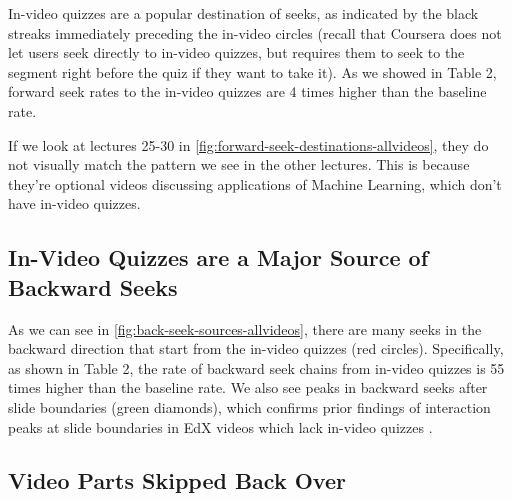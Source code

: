 \documentclass{sigchi}
\begin{document}
In-video quizzes are a popular destination of seeks, as indicated by the black streaks immediately preceding the in-video circles (recall that Coursera does not let users seek directly to in-video quizzes, but requires them to seek to the segment right before the quiz if they want to take it). As we showed in Table 2, forward seek rates to the in-video quizzes are 4 times higher than the baseline rate.


If we look at lectures 25-30 in \autoref{fig:forward-seek-destinations-allvideos}, they do not visually match the pattern we see in the other lectures. This is because they're optional videos discussing applications of Machine Learning, which don't have in-video quizzes. %


\subsection{In-Video Quizzes are a Major Source of Backward Seeks}

As we can see in \autoref{fig:back-seek-sources-allvideos}, there are many seeks in the backward direction that start from the in-video quizzes (red circles). Specifically, as shown in Table 2, the rate of backward seek chains from in-video quizzes is 55 times higher than the baseline rate. We also see peaks in backward seeks after slide boundaries (green diamonds), which confirms prior findings of interaction peaks at slide boundaries in EdX videos which lack in-video quizzes \cite{juho}.

\subsection{Video Parts Skipped Back Over}
\end{document}
